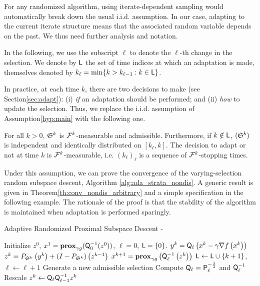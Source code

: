 {For any randomized algorithm,  
using iterate-dependent sampling would  automatically break down the usual i.i.d. assumption.} %
In our case, adapting to the current iterate structure means that the associated random variable depends on the past. We thus need further analysis and notation.

In the following, we use the subscript $\ell$ to denote the $\ell$-th change in the selection. We denote by $\mathsf{L}$ the set of time indices at which an adaptation is made, themselves denoted by $k_\ell  = \min \{ k> k_{\ell-1} : k\in\mathsf{L}\}$. 

In practice, at each time $k$, there are two decisions to make (see Section\;\ref{sec:adapt}): (i) \emph{if} an adaptation should be performed; and (ii) \emph{how} to update the selection. Thus, we replace the i.i.d. assumption of Assumption\;\ref{hyp:main} with the following one.

\begin{assumption}\label{hyp:main_identif}
For all $k>0$, $\mathfrak{S}^k$ is $\mathcal{F}^k$-measurable and admissible. Furthermore, if $k\notin\mathsf{L}$,  $(\mathfrak{S}^k)$ is independent and identically distributed on $[{k}_{\ell},k]$. The decision to adapt or not at time $k$ is $\mathcal{F}^k$-measurable, i.e. $(k_\ell)_\ell$ is a sequence of $\mathcal{F}^k$-stopping times. 
\end{assumption}

Under this assumption, we can prove the convergence of the varying-selection random subspace descent, Algorithm \ref{alg:ada_strata_nondis}. A generic result  is given in Theorem\;\ref{th:conv_nondis_arbitrary} and a simple specification in the following example. The rationale of the proof is that the stability of the algorithm is maintained when adaptation is performed sparingly. 


\begin{algorithm}[H] %
\caption{Adaptive Randomized Proximal Subspace Descent - \adaalgo}
\label{alg:ada_strata_nondis}
\begin{algorithmic}[1] %
    \STATE Initialize $z^0$, $x^1 = \mathbf{prox}_{\gamma g}({\mathsf{Q}}_0^{-1}(z^0))$, $\ell=0$, $\mathsf{L}=\{0\}$.
            \STATE $y^k = {\mathsf{Q}}_{\ell}\left(x^k - \gamma\nabla f\left(x^k\right)\right)$
            \STATE $z^{k} = P_{\mathfrak{S}^k} \left(y^k\right) + (I- P_{\mathfrak{S}^k} ) \left(z^{k-1}\right)$
            \STATE$x^{k+1} = \mathbf{prox}_{\gamma g} \left({\mathsf{Q}}_\ell^{-1}\left(z^{k}\right)\right)$
            \STATE $\mathsf{L} \leftarrow \mathsf{L} \cup \{k+1\}$, $\ell\leftarrow \ell +1$
            \STATE Generate a new admissible selection
            \STATE Compute ${\mathsf{Q}}_\ell = {\mathsf{P}}_\ell^{-\frac12}$ and ${\mathsf{Q}}_\ell^{-1}$
            \STATE Rescale $z^k \leftarrow {\mathsf{Q}}_\ell   {\mathsf{Q}}_{\ell-1}^{-1} z^k$ \label{line:rescale}
            \ENDIF
    \ENDFOR
\end{algorithmic}
\end{algorithm}



